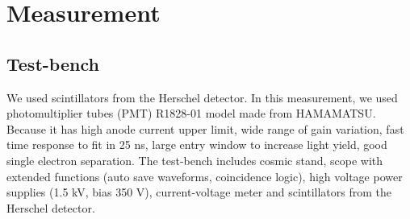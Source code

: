 \section{Measurement}
\label{sec:Measurement}


\subsection{Test-bench}
We used scintillators from the Herschel detector.
In this measurement, we used photomultiplier tubes (PMT) R1828-01 model made from HAMAMATSU.
Because it has high anode current upper limit, wide range of gain variation, fast time response to fit in 25 ns, large entry window to increase light yield, good single electron separation.
The test-bench includes cosmic stand, scope with extended functions (auto save waveforms, coincidence logic), high voltage power supplies (1.5 kV, bias 350 V), current-voltage meter and scintillators from the Herschel detector.

